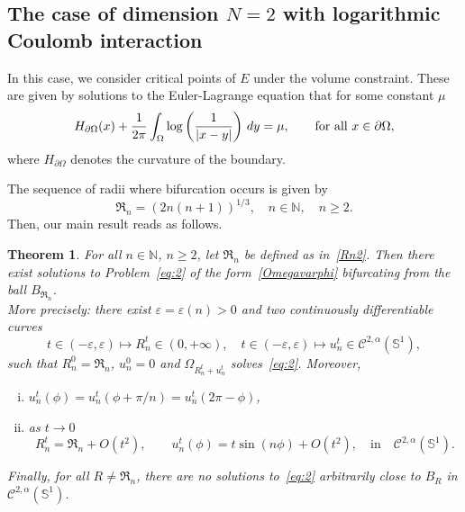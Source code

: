 \documentclass[10pt,reqno,english]{amsart}
\newcommand{\Su}{\mathbb{S}^1}
\newcommand{\rn}{{\mathfrak R}_n  }
\newcommand{\N}{\mathbb{N}}
\newcommand{\ve}{\varepsilon}
\newtheorem{theorem}{Theorem}
\theoremstyle{definition}
\numberwithin{equation}{section}
\begin{document}
\medskip

\subsection{The case of dimension \texorpdfstring{$N=2$}{N=2} with logarithmic Coulomb interaction}

In this case, we consider critical points of $E$ under the volume constraint. These are given by solutions to  the Euler-Lagrange equation that for some constant $\mu$
\begin{equation}
\label{eq:2}
H_{\partial\Omega}(x)+{1\over 2\pi} \int_\Omega \log \left( \frac{1}{|x-y|} \right) \, dy =\mu,
\qquad \text{for all } x\in\partial\Omega,
\end{equation}
where $H_{\partial\Omega}$ denotes the curvature of the boundary. 


The sequence
of radii where bifurcation occurs is given by 
\begin{equation}\label{Rn2}
\rn=(2n(n+1))^{1/3}, \quad n \in \N, \quad n \geq 2.
\end{equation}
Then, our main result reads as follows.


\begin{theorem}
\label{thm_N=2}
For all $n\in\N$, $n\ge2$, 
let $\rn$ be defined as in~\eqref{Rn2}. Then there exist solutions to Problem~\eqref{eq:2} of the form~\eqref{Omegavarphi} bifurcating from the ball $B_{\rn}$.\\
More precisely:
 there exist $\ve=\ve(n)>0$ and two continuously diﬀerentiable curves 
\[
 t\in(-\ve,\ve)\mapsto R_n^t\in(0,+\infty), \quad t\in(-\ve,\ve)\mapsto u_n^t\in\mathcal C^{2,\alpha}(\Su),
 \]
 such that $R_n^0= \rn$, $u_n^0=0$ and $\Omega_{R_n^t+u_n^t}$ solves~\eqref{eq:2}. Moreover,
\begin{enumerate}[i)]
\item $u_n^t(\phi)=u_n^t(\phi+\pi/n)=u_n^t(2\pi-\phi)$,
\item as $t \to 0$
\[
R_n^t= \rn+ O(t^2),\qquad u_n^t(\phi)=t \sin(n\phi)+O(t^2), \quad {\mbox {in}} \quad \mathcal C^{2,\alpha}(\Su).
\]
\end{enumerate}
\medskip
Finally, for all $R\not=\rn$, there are no solutions to~\eqref{eq:2} arbitrarily close to $B_R$ in $\mathcal C^{2,\alpha}(\Su)$.
\end{theorem}
\end{document}
